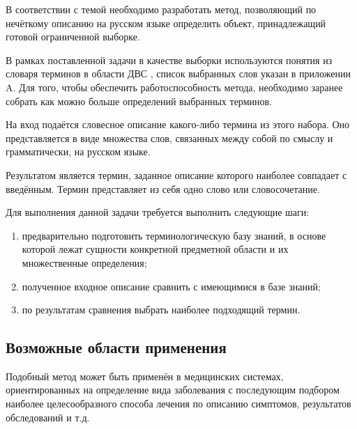 
В соответствии с темой необходимо разработать метод, позволяющий по нечёткому описанию на русском языке определить объект, принадлежащий готовой ограниченной выборке. 

В рамках поставленной задачи в качестве выборки используются понятия из словаря терминов в области ДВС \cite{ICE}, список выбранных слов указан в приложении A. Для того, чтобы обеспечить работоспособность метода, необходимо заранее собрать как можно больше определений выбранных терминов.

На вход подаётся словесное описание какого-либо термина из этого набора. Оно представляется в виде множества слов, связанных между собой по смыслу и грамматически, на русском языке. 

Результатом является термин, заданное описание которого наиболее совпадает с введённым. Термин представляет из себя одно слово или словосочетание. 

Для выполнения данной задачи требуется выполнить следующие шаги:
\begin{enumerate}
	\item предварительно подготовить терминологическую базу знаний, в основе которой лежат сущности конкретной предметной области и их множественные определения;
	
	\item полученное входное описание сравнить с имеющимися в базе знаний;
	
	\item по результатам сравнения выбрать наиболее подходящий термин. \newline
\end{enumerate}

\subsection{Возможные области применения}
Подобный метод может быть применён в медицинских системах, ориентированных на определение вида заболевания с последующим подбором наиболее целесообразного способа лечения по описанию симптомов, результатов обследований и т.д. 

